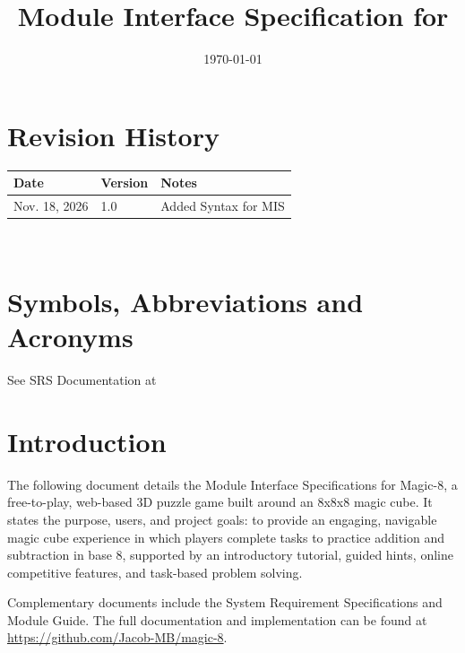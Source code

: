 \documentclass[12pt, titlepage]{article}
\begin{document}
\title{Module Interface Specification for \progname{}}

\author{\authname}

\date{\today}

\maketitle


\section{Revision History}

\begin{tabularx}{\textwidth}{p{3cm}p{2cm}X}
\toprule {\bf Date} & {\bf Version} & {\bf Notes}\\
\midrule
Nov. 18, 2026 & 1.0 & Added Syntax for MIS\\
\bottomrule
\end{tabularx}

~\newpage

\section{Symbols, Abbreviations and Acronyms}

See SRS Documentation at 


\newpage

\tableofcontents

\newpage


\section{Introduction}

The following document details the Module Interface Specifications for
Magic-8, a free-to-play, web-based 3D puzzle game built around an
8x8x8 magic cube. It states the purpose, users, and project goals: to provide an engaging,
navigable magic cube experience in which players complete tasks to practice addition and
subtraction in base 8, supported by an introductory tutorial, guided hints, online competitive
features, and task-based problem solving.

Complementary documents include the System Requirement Specifications
and Module Guide.  The full documentation and implementation can be
found at \url{https://github.com/Jacob-MB/magic-8}.
\end{document}
